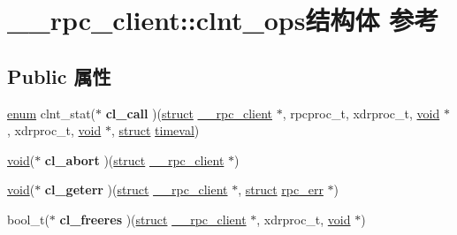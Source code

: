 \hypertarget{struct____rpc__client_1_1clnt__ops}{}\section{\+\_\+\+\_\+rpc\+\_\+client\+:\+:clnt\+\_\+ops结构体 参考}
\label{struct____rpc__client_1_1clnt__ops}
\subsection*{Public 属性}
\begin{DoxyCompactItemize}
\item 
\mbox{\label{struct____rpc__client_1_1clnt__ops_a392b35fa16859aca57cc3a968008aae9}} 
\hyperlink{interfaceenum}{enum} clnt\+\_\+stat($\ast$ {\bfseries cl\+\_\+call} )(\hyperlink{interfacestruct}{struct} \hyperlink{struct____rpc__client}{\+\_\+\+\_\+rpc\+\_\+client} $\ast$, rpcproc\+\_\+t, xdrproc\+\_\+t, \hyperlink{interfacevoid}{void} $\ast$, xdrproc\+\_\+t, \hyperlink{interfacevoid}{void} $\ast$, \hyperlink{interfacestruct}{struct} \hyperlink{structtimeval}{timeval})
\item 
\mbox{\label{struct____rpc__client_1_1clnt__ops_a1740a4f82b5c7589735b118ddb5f3425}} 
\hyperlink{interfacevoid}{void}($\ast$ {\bfseries cl\+\_\+abort} )(\hyperlink{interfacestruct}{struct} \hyperlink{struct____rpc__client}{\+\_\+\+\_\+rpc\+\_\+client} $\ast$)
\item 
\mbox{\label{struct____rpc__client_1_1clnt__ops_ac57e306bb7fb62f74ee6a75f2360b13a}} 
\hyperlink{interfacevoid}{void}($\ast$ {\bfseries cl\+\_\+geterr} )(\hyperlink{interfacestruct}{struct} \hyperlink{struct____rpc__client}{\+\_\+\+\_\+rpc\+\_\+client} $\ast$, \hyperlink{interfacestruct}{struct} \hyperlink{structrpc__err}{rpc\+\_\+err} $\ast$)
\item 
\mbox{\label{struct____rpc__client_1_1clnt__ops_ade3e2c45afd36a30fc2a6cd53ee89db2}} 
bool\+\_\+t($\ast$ {\bfseries cl\+\_\+freeres} )(\hyperlink{interfacestruct}{struct} \hyperlink{struct____rpc__client}{\+\_\+\+\_\+rpc\+\_\+client} $\ast$, xdrproc\+\_\+t, \hyperlink{interfacevoid}{void} $\ast$)
\item 

\end{DoxyCompactItemize}
